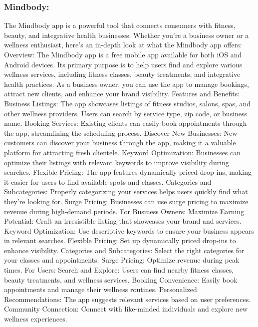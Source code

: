\documentclass{article}
\begin{document}
      \subsubsection{Mindbody:}
      The Mindbody app is a powerful tool that connects consumers with fitness, beauty, and integrative health businesses. Whether you’re a business owner or a wellness enthusiast, here’s an in-depth look at what the Mindbody app offers:
      Overview: The Mindbody app is a free mobile app available for both iOS and Android devices. Its primary purpose is to help users find and explore various wellness services, including fitness classes, beauty treatments, and integrative health practices.
      As a business owner, you can use the app to manage bookings, attract new clients, and enhance your brand visibility.
      Features and Benefits:
      Business Listings: The app showcases listings of fitness studios, salons, spas, and other wellness providers. Users can search by service type, zip code, or business name.
      Booking Services: Existing clients can easily book appointments through the app, streamlining the scheduling process.
      Discover New Businesses: New customers can discover your business through the app, making it a valuable platform for attracting fresh clientele.
      Keyword Optimization: Businesses can optimize their listings with relevant keywords to improve visibility during searches.
      Flexible Pricing: The app features dynamically priced drop-ins, making it easier for users to find available spots and classes.
      Categories and Subcategories: Properly categorizing your services helps users quickly find what they’re looking for.
      Surge Pricing: Businesses can use surge pricing to maximize revenue during high-demand periods.
      For Business Owners:
      Maximize Earning Potential: Craft an irresistible listing that showcases your brand and services.
      Keyword Optimization: Use descriptive keywords to ensure your business appears in relevant searches.
      Flexible Pricing: Set up dynamically priced drop-ins to enhance visibility.
      Categories and Subcategories: Select the right categories for your classes and appointments.
      Surge Pricing: Optimize revenue during peak times.
      For Users:
      Search and Explore: Users can find nearby fitness classes, beauty treatments, and wellness services.
      Booking Convenience: Easily book appointments and manage their wellness routines.
      Personalized Recommendations: The app suggests relevant services based on user preferences.
      Community Connection: Connect with like-minded individuals and explore new wellness experiences.
\end{document}
